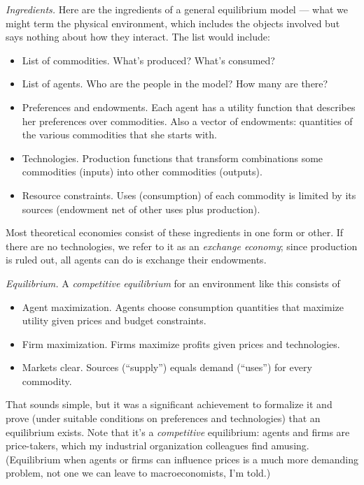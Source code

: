 \documentclass[11pt]{article}
\begin{document}
{\it Ingredients.\/}  Here are the ingredients of a general equilibrium model ---
what we might term the physical environment, which includes
the objects involved but says nothing about how they interact.
The list would include:
%
\begin{itemize}
\item List of commodities.   What's produced?  What's consumed?
\item List of agents.  Who are the people in the model?  How many are there?
\item Preferences and endowments.  Each agent has a utility function
that describes her preferences over commodities.
Also a vector of endowments:  quantities of the various commodities that she starts with.
\item Technologies.  Production functions that transform combinations some commodities (inputs)
into other commodities (outputs).
\item Resource constraints.  Uses (consumption) of each commodity is limited by
its sources (endowment net of other uses plus production).
\end{itemize}
Most theoretical economies consist of these ingredients in one form or other.
If there are no technologies, we refer to it as an {\it exchange economy\/};
since production is ruled out, all agents can do is exchange their endowments.


{\it Equilibrium.\/}
A {\it competitive equilibrium\/} for an environment like this consists of
%
\begin{itemize}
\item Agent maximization.
Agents choose consumption quantities that maximize utility given
prices and budget constraints.
\item Firm maximization.
Firms maximize profits given prices and technologies.
\item Markets clear.
Sources (``supply'') equals demand (``uses'') for every commodity.
\end{itemize}
That sounds simple, but it was a significant achievement to formalize it
and prove (under suitable conditions on preferences and technologies)
that an equilibrium exists.
Note that it's a {\it competitive\/} equilibrium:
agents and firms are price-takers, which my
industrial organization colleagues find amusing.
(Equilibrium when agents or firms can influence prices
is a much more demanding problem,
not one we can leave to macroeconomists, I'm told.)
\end{document}

